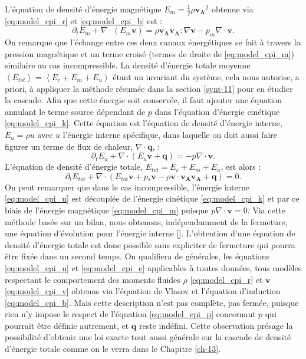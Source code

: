 L'équation de densité d'énergie magnétique $E_m = \frac{1}{2}\rho \boldsymbol{v_A}^2$ obtenue via \eqref{eq:model_cpi_r} et \eqref{eq:model_cpi_b} est :
\begin{equation}
  \label{eq:model_cpi_m}   \partial_t E_m  +\nabla   \cdot  \left(E_m\boldsymbol{v}\right)  = \rho  \boldsymbol{v_A}\boldsymbol{v_A}  : \nabla \boldsymbol{v}- p_m  \nabla \cdot \boldsymbol{v}.
\end{equation}
On remarque que l'échange entre ces deux canaux énergétiques se fait à travers la pression magnétique et un terme croisé (termes de droite de \eqref{eq:model_cpi_m}) similaire au cas incompressible. La densité d'énergie totale moyenne $\left<E_{tot}\right> = \left< E_c + E_m + E_u\right>$ étant un invariant du système, cela nous autorise, a priori, à appliquer la méthode résumée dans la section \ref{synt-11} pour en étudier la cascade. Afin que cette énergie soit conservée, il faut ajouter une équation annulant le terme source dépendant de $p$ dans l'équation d'énergie cinétique \eqref{eq:model_cpi_k}. Cette équation est l'équation de densité d'énergie interne, $E_u = \rho u$ avec $u$ l'énergie interne spécifique, dans laquelle on doit aussi faire figurer un terme de flux de chaleur, $\nabla \cdot \boldsymbol{q}$, :
\begin{equation}
   \label{eq:model_cpi_u}  \partial_t E_u +\nabla \cdot \left(E_u \boldsymbol{v} + \boldsymbol{q}\right)   = - p \nabla \cdot \boldsymbol{v}.
\end{equation}
L'équation de densité d'énergie totale, $E_{tot} = E_c + E_m + E_u$, est alors : 
\begin{equation}
   \label{eq:model_cpi_e}  \partial_t E_{tot} +\nabla \cdot \left(E_{tot} \boldsymbol{v} + p_* \boldsymbol{v}- \rho \boldsymbol{v} \cdot \boldsymbol{v_A}\boldsymbol{v_A} + \boldsymbol{q}\right)   = 0.
\end{equation}
On peut remarquer que dans le cas incompressible, l'énergie interne \eqref{eq:model_cpi_u} est découplée de l'énergie cinétique \eqref{eq:model_cpi_k} et par ce biais de l'énergie magnétique \eqref{eq:model_cpi_m} puisque $p \nabla \cdot \boldsymbol{v} = 0$. Via cette méthode basée sur un bilan, nous obtenons, indépendamment de la fermeture, une équation d'évolution pour l'énergie interne [\cite{eckart_thermodynamics_1940}]. L'obtention d'une équation de densité d'énergie totale est donc possible sans expliciter de fermeture qui pourra être fixée dans un second temps. On qualifiera de générales, les équations \eqref{eq:model_cpi_u} et \eqref{eq:model_cpi_e} applicables à toutes données, tous modèles respectant le comportement des moments fluides $\rho$ \eqref{eq:model_cpi_r} et $\boldsymbol{v}$ \eqref{eq:model_cpi_v} obtenus via l'équation de Vlasov et l'équation d'induction \eqref{eq:model_cpi_b}. Mais cette description n'est pas complète, pas fermée, puisque rien n'y impose le respect de l'équation \eqref{eq:model_cpi_p} concernant $p$ qui pourrait être définie autrement, et $\boldsymbol{q}$ reste indéfini. Cette observation présage la possibilité d'obtenir une loi exacte tout aussi générale sur la cascade de densité d'énergie totale comme on le verra dans le Chapitre \ref{ch-13}. 

